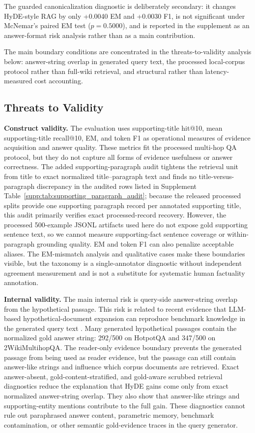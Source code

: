 The guarded canonicalization diagnostic is deliberately secondary: it changes HyDE-style RAG by only +0.0040 EM and +0.0030 F1, is not significant under McNemar's paired EM test ($p=0.5000$), and is reported in the supplement as an answer-format risk analysis rather than as a main contribution.

The main boundary conditions are concentrated in the threats-to-validity analysis below: answer-string overlap in generated query text, the processed local-corpus protocol rather than full-wiki retrieval, and structural rather than latency-measured cost accounting.

\subsection{Threats to Validity}
\label{sec:threats_to_validity}

\textbf{Construct validity.} The evaluation uses supporting-title hit@10, mean supporting-title recall@10, EM, and token F1 as operational measures of evidence acquisition and answer quality. These metrics fit the processed multi-hop QA protocol, but they do not capture all forms of evidence usefulness or answer correctness. The added supporting-paragraph audit tightens the retrieval unit from title to exact normalized title--paragraph text and finds no title-versus-paragraph discrepancy in the audited rows listed in Supplement Table~\ref{supp:tab:supporting_paragraph_audit}; because the released processed splits provide one supporting paragraph record per annotated supporting title, this audit primarily verifies exact processed-record recovery. However, the processed 500-example JSONL artifacts used here do not expose gold supporting sentence text, so we cannot measure supporting-fact sentence coverage or within-paragraph grounding quality. EM and token F1 can also penalize acceptable aliases. The EM-mismatch analysis and qualitative cases make these boundaries visible, but the taxonomy is a single-annotator diagnostic without independent agreement measurement and is not a substitute for systematic human factuality annotation.

\textbf{Internal validity.} The main internal risk is query-side answer-string overlap from the hypothetical passage. This risk is related to recent evidence that LLM-based hypothetical-document expansion can reproduce benchmark knowledge in the generated query text \cite{yoon2025knowledgeleakage}. Many generated hypothetical passages contain the normalized gold answer string: 292/500 on HotpotQA and 347/500 on 2WikiMultihopQA. The reader-only evidence boundary prevents the generated passage from being used as reader evidence, but the passage can still contain answer-like strings and influence which corpus documents are retrieved. Exact answer-absent, gold-content-stratified, and gold-aware scrubbed retrieval diagnostics reduce the explanation that HyDE gains come only from exact normalized answer-string overlap. They also show that answer-like strings and supporting-entity mentions contribute to the full gain. These diagnostics cannot rule out paraphrased answer content, parametric memory, benchmark contamination, or other semantic gold-evidence traces in the query generator.

